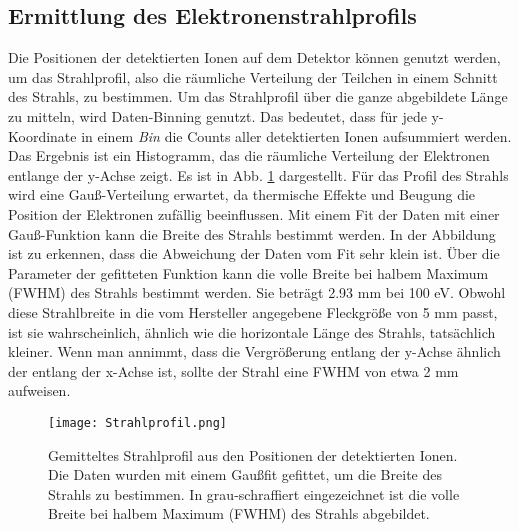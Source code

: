 \subsection{Ermittlung des Elektronenstrahlprofils}
Die Positionen der detektierten Ionen auf dem Detektor können genutzt werden, um das Strahlprofil, also die räumliche Verteilung der Teilchen in einem Schnitt des Strahls, zu bestimmen. Um das Strahlprofil über die ganze abgebildete Länge zu mitteln, wird Daten-Binning genutzt. Das bedeutet, dass für jede y-Koordinate in einem \textit{Bin} die Counts aller detektierten Ionen aufsummiert werden. Das Ergebnis ist ein Histogramm, das die räumliche Verteilung der Elektronen entlange der y-Achse zeigt. Es ist in Abb. \ref{fig:Strahlprofil} dargestellt. Für das Profil des Strahls wird eine Gauß-Verteilung erwartet, da thermische Effekte und Beugung die Position der Elektronen zufällig beeinflussen. Mit einem Fit der Daten mit einer Gauß-Funktion kann die Breite des Strahls bestimmt werden. In der Abbildung ist zu erkennen, dass die Abweichung der Daten vom Fit sehr klein ist. Über die Parameter der gefitteten Funktion kann die volle Breite bei halbem Maximum (FWHM) des Strahls bestimmt werden. Sie beträgt 2.93 mm bei 100 eV. Obwohl diese Strahlbreite in die vom Hersteller angegebene Fleckgröße von 5 mm passt, ist sie wahrscheinlich, ähnlich wie die horizontale Länge des Strahls, tatsächlich kleiner. Wenn man annimmt, dass die Vergrößerung entlang der y-Achse ähnlich der entlang der x-Achse ist, sollte der Strahl eine FWHM von etwa 2 mm aufweisen.

\begin{figure}
    \centering
    \texttt{[image: Strahlprofil.png]}
    \caption[Gemitteltes Strahlprofil]{Gemitteltes Strahlprofil aus den Positionen der detektierten Ionen. Die Daten wurden mit einem Gaußfit gefittet, um die Breite des Strahls zu bestimmen. In grau-schraffiert eingezeichnet ist die volle Breite bei halbem Maximum (FWHM) des Strahls abgebildet.}
    \label{fig:Strahlprofil} 
\end{figure}